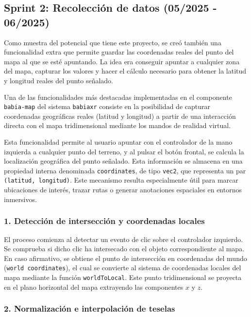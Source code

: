 \documentclass[a4paper, 12pt]{book}
\begin{document}
\subsection{Sprint 2: Recolección de datos (05/2025 - 06/2025)} 
\label{subsec:coordenadas-f4-s2}

Como muestra del potencial que tiene este proyecto, se creó también una funcionalidad extra que permite guardar las coordenadas reales del punto del mapa al que se esté apuntando. La idea era conseguir apuntar a cualquier zona del mapa, capturar los valores y hacer el cálculo necesario para obtener la latitud y longitud reales del punto señalado.

Una de las funcionalidades más destacadas implementadas en el componente \texttt{babia-map} del sistema \texttt{babiaxr} consiste en la posibilidad de capturar coordenadas geográficas reales (latitud y longitud) a partir de una interacción directa con el mapa tridimensional mediante los mandos de realidad virtual.

Esta funcionalidad permite al usuario apuntar con el controlador de la mano izquierda a cualquier punto del terreno, y al pulsar el botón frontal, se calcula la localización geográfica del punto señalado. Esta información se almacena en una propiedad interna denominada \texttt{coordinates}, de tipo \texttt{vec2}, que representa un par \texttt{(latitud, longitud)}. Este mecanismo resulta especialmente útil para marcar ubicaciones de interés, trazar rutas o generar anotaciones espaciales en entornos inmersivos.

\subsubsection*{1. Detección de intersección y coordenadas locales}

El proceso comienza al detectar un evento de clic sobre el controlador izquierdo. Se comprueba si dicho clic ha intersecado con el objeto correspondiente al mapa. En caso afirmativo, se obtiene el punto de intersección en coordenadas del mundo (\texttt{world coordinates}), el cual se convierte al sistema de coordenadas locales del mapa mediante la función \texttt{worldToLocal}. Este punto tridimensional se proyecta en el plano horizontal del mapa extrayendo las componentes $x$ y $z$.

\subsubsection*{2. Normalización e interpolación de teselas}
\end{document}
